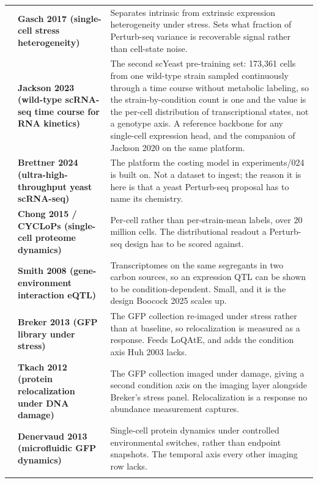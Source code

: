 \begin{longtable}{@{}r@{\hspace{4pt}} L{46mm} L{112mm}@{}}
 & \textbf{Gasch 2017 (single-cell stress heterogeneity)} & Separates intrinsic from extrinsic expression heterogeneity under stress. Sets what fraction of Perturb-seq variance is recoverable signal rather than cell-state noise. \\
 & \textbf{Jackson 2023 (wild-type scRNA-seq time course for RNA kinetics)} & The second scYeast pre-training set: 173,361 cells from one wild-type strain sampled continuously through a time course without metabolic labeling, so the strain-by-condition count is one and the value is the per-cell distribution of transcriptional states, not a genotype axis. A reference backbone for any single-cell expression head, and the companion of Jackson 2020 on the same platform. \\
 & \textbf{Brettner 2024 (ultra-high-throughput yeast scRNA-seq)} & The platform the costing model in experiments/024 is built on. Not a dataset to ingest; the reason it is here is that a yeast Perturb-seq proposal has to name its chemistry. \\
 & \textbf{Chong 2015 / CYCLoPs (single-cell proteome dynamics)} & Per-cell rather than per-strain-mean labels, over 20 million cells. The distributional readout a Perturb-seq design has to be scored against. \\
 & \textbf{Smith 2008 (gene-environment interaction eQTL)} & Transcriptomes on the same segregants in two carbon sources, so an expression QTL can be shown to be condition-dependent. Small, and it is the design Boocock 2025 scales up. \\
 & \textbf{Breker 2013 (GFP library under stress)} & The GFP collection re-imaged under stress rather than at baseline, so relocalization is measured as a response. Feeds LoQAtE, and adds the condition axis Huh 2003 lacks. \\
 & \textbf{Tkach 2012 (protein relocalization under DNA damage)} & The GFP collection imaged under damage, giving a second condition axis on the imaging layer alongside Breker's stress panel. Relocalization is a response no abundance measurement captures. \\
 & \textbf{Denervaud 2013 (microfluidic GFP dynamics)} & Single-cell protein dynamics under controlled environmental switches, rather than endpoint snapshots. The temporal axis every other imaging row lacks. \\
\addlinespace[5pt]

\end{longtable}

